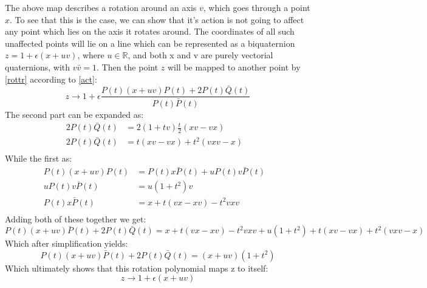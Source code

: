 The above map describes a rotation around an axis $v$, which goes through a point $x$. To see that this is the case, we can show that it's action is not going to affect any point which lies on the axis it rotates around. The coordinates of all such unaffected points will lie on a line which can be represented as a biquaternion $z = 1 + \epsilon(x + u v)$, where  $u\in \mathbb{R}$, and both x and v are purely vectorial quaternions, with $v\bar{v} = 1$. Then the point $z$ will be mapped to another point by \ref{rottr} according to \ref{act}:
\begin{equation}
    z \rightarrow 1 +\epsilon \frac{P(t)(x+uv)P(t) + 2P(t)\bar{Q}(t)}{P(t)\bar{P}(t)}
\end{equation}
The second part can be expanded as:
\begin{equation}
    \begin{aligned}
        2P(t)\bar{Q}(t)&=2(1+tv)\frac{t}{2}(xv-vx)&\mbox{}\\[1.25ex]
        2P(t)\bar{Q}(t)&=t(xv-vx)+t^{2}(vxv - x)&\mbox{}\\[1.25ex]
    \end{aligned}
\end{equation}
While the first as:
\begin{equation}
    \begin{aligned}
        P(t)(x+uv)P(t)&=P(t)x\bar{P}(t) + u P(t)v\bar{P}(t)&\mbox{}\\[1.25ex]
        uP(t)v\bar{P}(t)&= u(1+t^{2})v&\mbox{}\\[1.25ex]
        P(t)x\bar{P}(t)&= x + t(vx-xv)-t^{2}vxv&\mbox{}\\[1.25ex]
    \end{aligned}
\end{equation}
Adding both of these together we get:
\begin{equation}
    P(t)(x+uv)\bar{P}(t) + 2P(t)\bar{Q}(t) = x + t(vx-xv) - t^{2}vxv+u(1+t^{2}) + t(xv-vx) + t^{2}(vxv-x)
\end{equation}
Which after simplification yields:
\begin{equation}
    P(t)(x+uv)\bar{P}(t) + 2P(t)\bar{Q}(t) = (x + uv)(1+t^{2})
\end{equation}
Which ultimately shows that this rotation polynomial maps z to itself:
\begin{equation}
    z \rightarrow 1+\epsilon(x+uv)
\end{equation}


